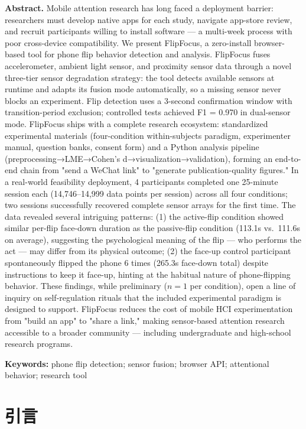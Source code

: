 \documentclass[12pt,a4paper]{ctexart}
\begin{document}
\noindent\textbf{Abstract.} Mobile attention research has long faced a deployment barrier: researchers must develop native apps for each study, navigate app-store review, and recruit participants willing to install software — a multi-week process with poor cross-device compatibility. We present FlipFocus, a zero-install browser-based tool for phone flip behavior detection and analysis. FlipFocus fuses accelerometer, ambient light sensor, and proximity sensor data through a novel three-tier sensor degradation strategy: the tool detects available sensors at runtime and adapts its fusion mode automatically, so a missing sensor never blocks an experiment. Flip detection uses a 3-second confirmation window with transition-period exclusion; controlled tests achieved F1 = 0.970 in dual-sensor mode. FlipFocus ships with a complete research ecosystem: standardized experimental materials (four-condition within-subjects paradigm, experimenter manual, question banks, consent form) and a Python analysis pipeline (preprocessing→LME→Cohen's d→visualization→validation), forming an end-to-end chain from "send a WeChat link" to "generate publication-quality figures." In a real-world feasibility deployment, 4 participants completed one 25-minute session each (14,746--14,999 data points per session) across all four conditions; two sessions successfully recovered complete sensor arrays for the first time. The data revealed several intriguing patterns: (1) the active-flip condition showed similar per-flip face-down duration as the passive-flip condition (113.1s vs.\ 111.6s on average), suggesting the psychological meaning of the flip — who performs the act — may differ from its physical outcome; (2) the face-up control participant spontaneously flipped the phone 6 times (265.3s face-down total) despite instructions to keep it face-up, hinting at the habitual nature of phone-flipping behavior. These findings, while preliminary ($n=1$ per condition), open a line of inquiry on self-regulation rituals that the included experimental paradigm is designed to support. FlipFocus reduces the cost of mobile HCI experimentation from "build an app" to "share a link," making sensor-based attention research accessible to a broader community — including undergraduate and high-school research programs.

\noindent\textbf{Keywords:} phone flip detection; sensor fusion; browser API; attentional behavior; research tool

\section{引言}
\end{document}
